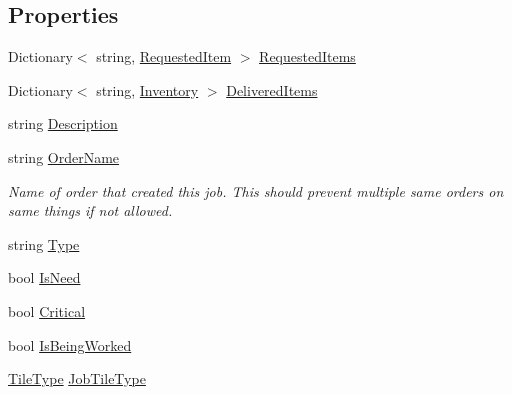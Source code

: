 \subsection*{Properties}
\begin{DoxyCompactItemize}
\item 
Dictionary$<$ string, \hyperlink{class_project_porcupine_1_1_jobs_1_1_requested_item}{Requested\+Item} $>$ \hyperlink{class_job_adf323467d52d8b22ce88d9df48883c52}{Requested\+Items}
\item 
Dictionary$<$ string, \hyperlink{class_inventory}{Inventory} $>$ \hyperlink{class_job_a0ce910378be270a7b858139a3f7dac5e}{Delivered\+Items}
\item 
string \hyperlink{class_job_afeda12f81081285a25b0b14196ea5dfd}{Description}
\item 
string \hyperlink{class_job_abff4812529dfc153d28274a818128243}{Order\+Name}
\begin{DoxyCompactList}\small\item\em Name of order that created this job. This should prevent multiple same orders on same things if not allowed. \end{DoxyCompactList}\item 
string \hyperlink{class_job_a5656d78f1d382334c43364c1318f5c27}{Type}
\item 
bool \hyperlink{class_job_afab3bbba6fbbf4a8982f8ae4a52642da}{Is\+Need}
\item 
bool \hyperlink{class_job_addc4cd9d9fbf1a6faa155fae581b72b2}{Critical}
\item 
bool \hyperlink{class_job_a176a9fc1578ec68148bbddfc46434fe9}{Is\+Being\+Worked}
\item 
\hyperlink{class_tile_type}{Tile\+Type} \hyperlink{class_job_ad894f38bb82ebf71a83f803f72bbf54e}{Job\+Tile\+Type}

\end{DoxyCompactItemize}
